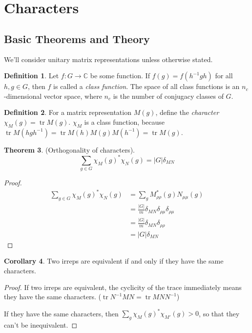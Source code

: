 \documentclass[12pt, letterpaper]{article}
\theoremstyle{definition} %
\newtheorem{thm}{Theorem}[section] %
\newtheorem{defn}[thm]{Definition} %
\newtheorem{cor}[thm]{Corollary}
\def\tr{\operatorname{tr}}
\begin{document}
\section{Characters}

\subsection{Basic Theorems and Theory}

We'll consider unitary matrix representations unless otherwise stated.

\begin{defn}
  Let $f:G\to \mathbb{C}$ be some function. If $f(g)=f(h^{-1} g h)$ for all $h,g\in G$, then $f$ is called a \emph{class function}.
  The space of all class functions is an $n_c$-dimensional vector space, where $n_c$ is the number of conjugacy classes of $G$. 
\end{defn}
\begin{defn}
  For a matrix representation $M(g)$, define the \emph{character} $\chi_M(g)=\tr M(g)$. $\chi_M$ is a class function, because 
  $\tr M(h g h^{-1})=\tr M(h)M(g)M(h^{-1})=\tr M(g)$.
\end{defn}
\begin{thm} (Orthogonality of characters). 
  \begin{equation*}
    \sum_{g\in G} \chi_M(g)^* \chi_N(g)=|G|\delta_{MN}
  \end{equation*}
   \label{orthogonality2}
\end{thm}
\begin{proof}
  \begin{align*}
    \sum_{g\in G} \chi_M(g)^* \chi_N(g)&= \sum_g M^*_{\rho\rho}(g) N_{\mu\mu}(g)\\
    &= \frac{|G|}{m}\delta_{MN} \delta_{\rho\mu}\delta_{\rho\mu}\\
    &= \frac{|G|}{m}\delta_{MN} \delta_{\rho\rho}\\
    &= |G|\delta_{MN}
  \end{align*}
\end{proof}
\begin{cor}
  Two irreps are equivalent if and only if they have the same characters.
\end{cor}
\begin{proof}
  If two irreps are equivalent, the cyclicity of the trace immediately means they have the same characters. ($\tr N^{-1} M N = \tr M N N^{-1}$)

  If they have the same characters, then $\sum_g \chi_M(g)^* \chi_{M'}(g)>0$, so that they can't be inequivalent.
\end{proof}
\end{document}

